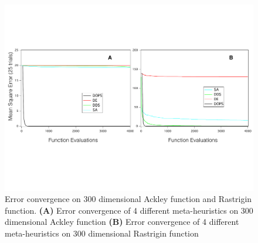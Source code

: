 \documentclass[12pt]{article}
\begin{document}
\begin{figure}[ht]
\centering
\includegraphics[width=1.00\textwidth]{./figs/Figure_6_Ackley_Rast}
\caption{Error convergence on 300 dimensional Ackley function and Rastrigin function. \textbf {(A)} Error convergence of 4 different meta-heuristics on 300 dimensional Ackley function \textbf {(B)} Error convergence of 4 different meta-heuristics on 300 dimensional Rastrigin function
}\label{fig-testfunctions}
\end{figure}
\end{document}
